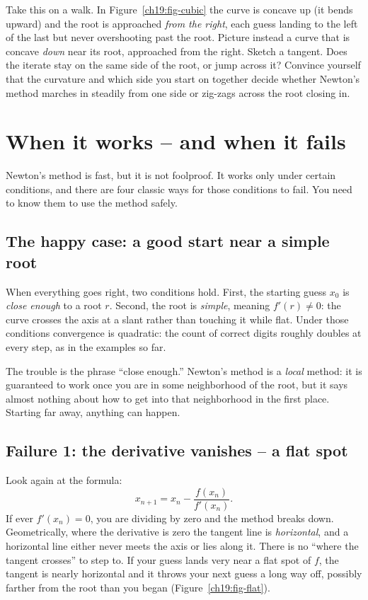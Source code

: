 \begin{walkbox}
Take this on a walk. In Figure~\ref{ch19:fig-cubic} the curve is concave up (it
bends upward) and the root is approached \emph{from the right}, each guess landing
to the left of the last but never overshooting past the root. Picture instead a
curve that is concave \emph{down} near its root, approached from the right. Sketch
a tangent. Does the iterate stay on the same side of the root, or jump across it?
Convince yourself that the curvature and which side you start on together decide
whether Newton's method marches in steadily from one side or zig-zags across the
root closing in.
\end{walkbox}

\section{When it works -- and when it fails}
\label{ch19:failures}

Newton's method is fast, but it is not foolproof. It works only under certain
conditions, and there are four classic ways for those conditions to fail. You need
to know them to use the method safely.

\subsection{The happy case: a good start near a simple root}

When everything goes right, two conditions hold. First, the starting guess $x_0$ is
\emph{close enough} to a root $r$. Second, the root is \emph{simple}, meaning
$f'(r) \ne 0$: the curve crosses the axis at a slant rather than touching it
while flat. Under those conditions convergence is quadratic: the count of correct
digits roughly doubles at every step, as in the examples so far.

The trouble is the phrase ``close enough.'' Newton's method is a \emph{local}
method: it is guaranteed to work once you are in some neighborhood of the root,
but it says almost nothing about how to get into that neighborhood in the first
place. Starting far away, anything can happen.

\subsection{Failure 1: the derivative vanishes -- a flat spot}

Look again at the formula:
\[
  x_{n+1} = x_n - \frac{f(x_n)}{f'(x_n)}.
\]
If ever $f'(x_n) = 0$, you are dividing by zero and the method breaks down.
Geometrically, where the derivative is zero the tangent line is \emph{horizontal},
and a horizontal line either never meets the axis or lies along it. There is no
``where the tangent crosses'' to step to. If your guess lands very near a flat
spot of $f$, the tangent is nearly horizontal and it throws your next guess a long
way off, possibly farther from the root than you began
(Figure~\ref{ch19:fig-flat}).

